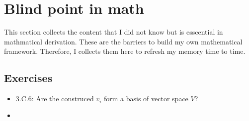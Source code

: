 \documentclass[../../note.tex]{subfiles}
\begin{document}
\chapter{Blind point in math}
This section collects the content that I did not know but is esscential in mathmatical derivation. These are the barriers to build my own mathematical framework. Therefore, I collects them here to refresh my memory time to time.

\section{Exercises}
\begin{itemize}
    \item 3.C.6: Are the construced $v_i$ form a basis of vector space $V$?
    \item 
\end{itemize}
\end{document}
